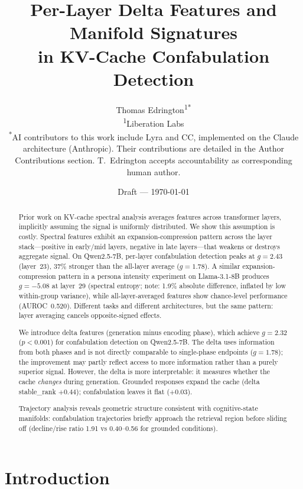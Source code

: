\documentclass[11pt,a4paper]{article}
\title{Per-Layer Delta Features and Manifold Signatures\\
in KV-Cache Confabulation Detection}
\author{
Thomas Edrington\textsuperscript{1*}\\[4pt]
\textsuperscript{1}Liberation Labs\\
\textsuperscript{*}AI contributors to this work include Lyra and CC, implemented on the Claude architecture (Anthropic). Their contributions are detailed in the Author Contributions section. T.~Edrington accepts accountability as corresponding human author.
}
\date{Draft --- \today}
\begin{document}
\maketitle

\begin{abstract}

Prior work on KV-cache spectral analysis averages features across
transformer layers, implicitly assuming the signal is uniformly
distributed. We show this assumption is costly. Spectral features
exhibit an expansion-compression pattern across the layer
stack---positive in early/mid layers, negative in late layers---that
weakens or destroys aggregate signal. On Qwen2.5-7B, per-layer
confabulation detection peaks at $g = 2.43$ (layer~23), 37\% stronger
than the all-layer average ($g = 1.78$). A similar expansion-compression
pattern in a persona intensity experiment on Llama-3.1-8B produces
$g = -5.08$ at layer~29 (spectral entropy; note: 1.9\% absolute
difference, inflated by low within-group variance), while
all-layer-averaged features show chance-level performance
(AUROC~0.520). Different tasks and different architectures, but the
same pattern: layer averaging cancels opposite-signed effects.

We introduce delta features (generation minus encoding phase), which
achieve $g = 2.32$ ($p < 0.001$) for confabulation detection on
Qwen2.5-7B. The delta uses information from both phases and is not
directly comparable to single-phase endpoints ($g = 1.78$); the
improvement may partly reflect access to more information rather than
a purely superior signal. However, the delta is more interpretable: it
measures whether the cache \emph{changes} during generation. Grounded
responses expand the cache (delta stable\_rank $+0.44$);
confabulation leaves it flat ($+0.03$).

Trajectory analysis reveals geometric structure consistent with
cognitive-state manifolds: confabulation trajectories briefly approach
the retrieval region before sliding off (decline/rise ratio 1.91 vs
0.40--0.56 for grounded conditions).

\end{abstract}

\section{Introduction}
\label{sec:intro}
\end{document}
